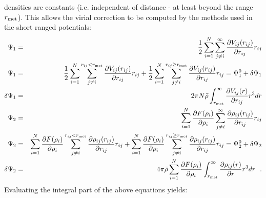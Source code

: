 densities are constants (i.e. independent of distance - at least
beyond the range $r_{\rm met}$).  This allows the virial correction to
be computed by the methods used in the short ranged potentials:
\begin{eqnarray}
\Psi_{1} &=& {1 \over 2} \sum_{i=1}^{N} \sum_{j \ne i}^{\infty}
\frac{\partial V_{ij}(r_{ij})}{\partial r_{ij}} r_{ij} \nonumber \\
\Psi_{1} &=& {1 \over 2} \sum_{i=1}^{N} \sum_{j \ne i}^{r_{ij}<r_{\rm met}}
\frac{\partial V_{ij}(r_{ij})}{\partial r_{ij}} r_{ij} +
{1 \over 2} \sum_{i=1}^{N} \sum_{j \ne i}^{r_{ij} \ge r_{\rm met}}
\frac{\partial V_{ij}(r_{ij})}{\partial r_{ij}} r_{ij} = \Psi_{1}^{0} + \delta \Psi_{1} \nonumber \\
\delta \Psi_{1} &=& 2 \pi N \bar{\rho} \int_{r_{\rm met}}^{\infty}
\frac{\partial V_{ij}(r)}{\partial r_{ij}} r^{3} dr \nonumber \\
\Psi_{2} &=& \sum_{i=1}^{N} \frac{\partial F(\rho_{i})}{\partial \rho_{i}}
\sum_{j \ne i}^{\infty} \frac{\partial \rho_{ij}(r_{ij})}{\partial r_{ij}} r_{ij} \\
\Psi_{2} &=& \sum_{i=1}^{N} \frac{\partial F(\rho_{i})}{\partial \rho_{i}}
\sum_{j \ne i}^{r_{ij}<r_{\rm met}} \frac{\partial \rho_{ij}(r_{ij})}{\partial r_{ij}} r_{ij} +
\sum_{i=1}^{N} \frac{\partial F(\rho_{i})}{\partial \rho_{i}}
\sum_{j \ne i}^{r_{ij} \ge r_{\rm met}} \frac{\partial \rho_{ij}(r_{ij})}{\partial r_{ij}} r_{ij} = \Psi_{2}^{0} + \delta \Psi_{2} \nonumber \\
\delta \Psi_{2} &=& 4 \pi \bar{\rho} \sum_{i=1}^{N} \frac{\partial F(\rho_{i})}{\partial \rho_{i}}
\int_{r_{\rm met}}^{\infty} \frac{\partial \rho_{ij}(r)}{\partial r} r^{3} dr~~. \nonumber
\end{eqnarray}
Evaluating the integral part of the above equations yields:
